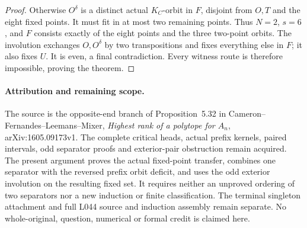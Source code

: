 \documentclass[11pt,a4paper]{article}
\begin{document}
\begin{proof}
Otherwise $O^\delta$ is a distinct actual $K_C$-orbit in $F$,
disjoint from $O,T$ and the eight fixed points. It must fit
in at most two remaining points. Thus $N=2$, $s=6$, and
$F$ consists exactly of the eight points and the three
two-point orbits. The involution exchanges $O,O^\delta$
by two transpositions and fixes everything else in $F$;
it also fixes $U$. It is even, a final contradiction.
Every witness route is therefore impossible, proving the theorem.
\end{proof}

\paragraph{Attribution and remaining scope.}
The source is the opposite-end branch of Proposition~5.32 in
Cameron--Fernandes--Leemans--Mixer, \emph{Highest rank of a polytope
for $A_n$}, arXiv:1605.09173v1. The complete critical heads,
actual prefix kernels, paired intervals, odd separator proofs and
exterior-pair obstruction remain acquired. The present argument
proves the actual fixed-point transfer, combines one separator
with the reversed prefix orbit deficit, and uses the odd exterior
involution on the resulting fixed set. It requires neither an
unproved ordering of two separators nor a new induction or finite
classification. The terminal singleton attachment and full L044
source and induction assembly remain separate. No whole-original,
question, numerical or formal credit is claimed here.
\end{document}
